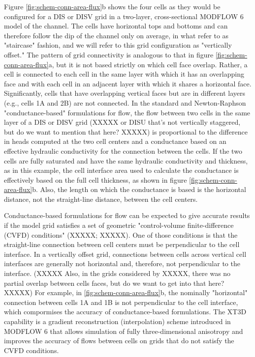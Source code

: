 \documentclass{article}
\begin{document}
Figure \ref{fig:schem-conn-area-flux}b shows the four cells as they would be configured for a DIS or DISV grid in a two-layer, cross-sectional MODFLOW 6 model of the channel. The cells have horizontal tops and bottoms and can therefore follow the dip of the channel only on average, in what \cite{bardot2022} refer to as "staircase" fashion, and we will refer to this grid configuration as "vertically offset." The pattern of grid connectivity is analogous to that in figure \ref{fig:schem-conn-area-flux}a, but it is not based strictly on which cell face overlap. Rather, a cell is connected to each cell in the same layer with which it has an overlapping face and with each cell in an adjacent layer with which it shares a horizontal face. Significantly, cells that have overlapping vertical faces but are in different layers (e.g., cells 1A and 2B) are not connected. In the standard and Newton-Raphson "conductance-based" formulations for flow, the flow between two cells in the same layer of a DIS or DISV grid (XXXXX or DISU that's not vertically staggered, but do we want to mention that here? XXXXX) is proportional to the difference in heads computed at the two cell centers and a conductance based on an effective hydraulic conductivity for the connection between the cells. If the two cells are fully saturated and have the same hydraulic conductivity and thickness, as in this example, the cell interface area used to calculate the conductance is effectively based on the full cell thickness, as shown in figure \ref{fig:schem-conn-area-flux}b. Also, the length on which the conductance is based is the horizontal distance, not the straight-line distance, between the cell centers.

Conductance-based formulations for flow can be expected to give accurate results if the model grid satisfies a set of geometric "control-volume finite-difference (CVFD) conditions" (XXXXX; XXXXX). One of those conditions is that the straight-line connection between cell centers must be perpendicular to the cell interface. In a vertically offset grid, connections between cells across vertical cell interfaces are generally not horizontal and, therefore, not perpendicular to the interface. (XXXXX Also, in the grids considered by XXXXX, there was no partial overlap between cells faces, but do we want to get into that here? XXXXX) For example, in \ref{fig:schem-conn-area-flux}b, the nominally "horizontal" connection between cells 1A and 1B is not perpendicular to the cell interface, which compormises the accuracy of conductance-based formulations. The XT3D capability is a gradient reconstruction (interpolation) scheme introduced in MODFLOW 6 that allows simulation of fully three-dimensional anisotropy and improves the accuracy of flows between cells on grids that do not satisfy the CVFD conditions.
\end{document}
